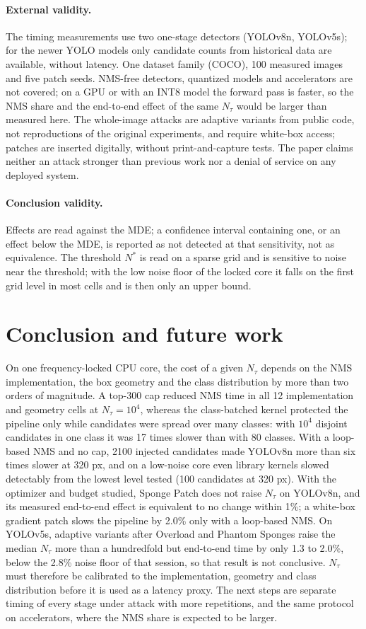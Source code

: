 \documentclass[a4paper,fleqn]{cas-dc}
\newcommand{\Ntau}{N_{\tau}}
\begin{document}
\paragraph{External validity.}
The timing measurements use two one-stage detectors (YOLOv8n, YOLOv5s); for the newer YOLO models only candidate counts from historical data are available, without latency. One dataset family (COCO), 100 measured images and five patch seeds. NMS-free detectors, quantized models and accelerators are not covered; on a GPU or with an INT8 model the forward pass is faster, so the NMS share and the end-to-end effect of the same $\Ntau$ would be larger than measured here. The whole-image attacks are adaptive variants from public code, not reproductions of the original experiments, and require white-box access; patches are inserted digitally, without print-and-capture tests. The paper claims neither an attack stronger than previous work nor a denial of service on any deployed system.
\paragraph{Conclusion validity.}
Effects are read against the MDE; a confidence interval containing one, or an effect below the MDE, is reported as not detected at that sensitivity, not as equivalence. The threshold $N^{*}$ is read on a sparse grid and is sensitive to noise near the threshold; with the low noise floor of the locked core it falls on the first grid level in most cells and is then only an upper bound.

\section{Conclusion and future work}
\label{sec:conclusion}
On one frequency-locked CPU core, the cost of a given $\Ntau$ depends on the NMS implementation, the box geometry and the class distribution by more than two orders of magnitude. A top-300 cap reduced NMS time in all 12 implementation and geometry cells at $\Ntau=10^4$, whereas the class-batched kernel protected the pipeline only while candidates were spread over many classes: with $10^4$ disjoint candidates in one class it was 17 times slower than with 80 classes. With a loop-based NMS and no cap, 2100 injected candidates made YOLOv8n more than six times slower at 320 px, and on a low-noise core even library kernels slowed detectably from the lowest level tested (100 candidates at 320 px). With the optimizer and budget studied, Sponge Patch does not raise $\Ntau$ on YOLOv8n, and its measured end-to-end effect is equivalent to no change within 1\%; a white-box gradient patch slows the pipeline by 2.0\% only with a loop-based NMS. On YOLOv5s, adaptive variants after Overload and Phantom Sponges raise the median $\Ntau$ more than a hundredfold but end-to-end time by only 1.3 to 2.0\%, below the 2.8\% noise floor of that session, so that result is not conclusive. $\Ntau$ must therefore be calibrated to the implementation, geometry and class distribution before it is used as a latency proxy. The next steps are separate timing of every stage under attack with more repetitions, and the same protocol on accelerators, where the NMS share is expected to be larger.
\end{document}
